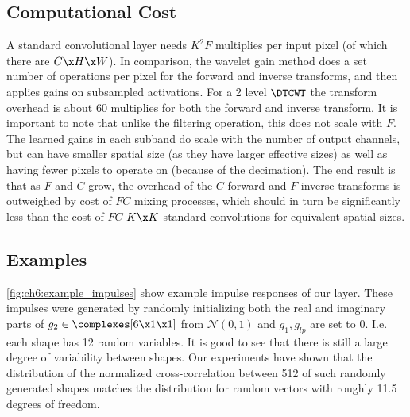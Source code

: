 \subsection{Computational Cost}
A standard convolutional layer needs $K^2 F$ multiplies per input pixel (of
which there are $C\x H\x W$). In comparison, the wavelet gain method does a set
number of operations per pixel for the forward and inverse transforms, and then
applies gains on subsampled activations. For a 2 level $\DTCWT$ the transform
overhead is about 60 multiplies for both the forward and inverse transform. It
is important to note that unlike the filtering operation, this does not scale
with $F$. The learned gains in each subband do scale with the number of output
channels, but can have smaller spatial size (as they have larger effective
sizes) as well as having fewer pixels to operate on (because of the decimation).
The end result is that as $F$ and $C$ grow, the overhead of the $C$ forward and
$F$ inverse transforms is outweighed by cost of $FC$ mixing processes, which
should in turn be significantly less than the cost of $FC$ $K\x K$ standard
convolutions for equivalent spatial sizes.


\subsection{Examples}
\autoref{fig:ch6:example_impulses} show example impulse responses of our layer.
These impulses were generated by randomly initializing both the real and
imaginary parts of $g_2 \in \complexes[6\x 1\x 1]$ from $\mathcal{N}(0,1)$ and
$g_1, g_{lp}$ are set to 0. I.e. each shape has 12 random variables. It is good
to see that there is still a large degree of variability between shapes. Our
experiments have shown that the distribution of the normalized cross-correlation
between 512 of such randomly generated shapes matches the distribution for
random vectors with roughly 11.5 degrees of freedom.

